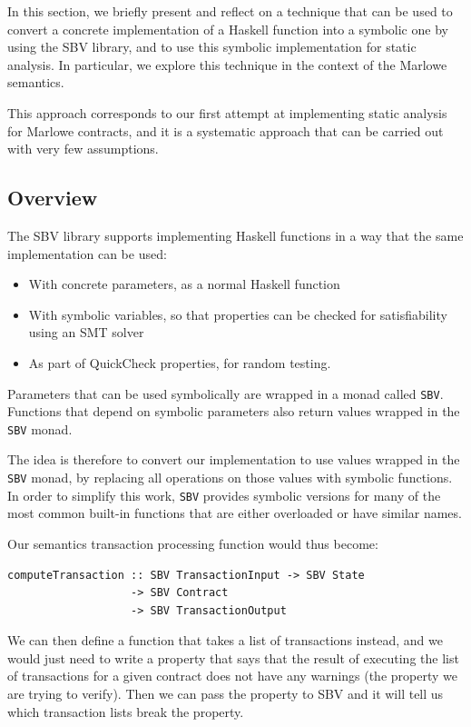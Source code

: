 \documentclass[english,runningheads]{llncs}
\begin{document}
In this section, we briefly present and reflect on a technique that
can be used to convert a concrete implementation of a Haskell function
into a symbolic one by using the SBV library, and to use this symbolic
implementation for static analysis. In particular, we explore this
technique in the context of the Marlowe semantics.

This approach corresponds to our first attempt at implementing static
analysis for Marlowe contracts, and it is a systematic approach that
can be carried out with very few assumptions. 

\subsection{Overview}

The SBV library supports implementing Haskell functions in a way that
the same implementation can be used:
\begin{itemize}
\item With concrete parameters, as a normal Haskell function
\item With symbolic variables, so that properties can be checked for satisfiability
using an SMT solver
\item As part of QuickCheck properties, for random testing.
\end{itemize}
Parameters that can be used symbolically are wrapped in a monad called
\texttt{SBV}. Functions that depend on symbolic parameters also return
values wrapped in the \texttt{SBV} monad.

The idea is therefore to convert our implementation to use values
wrapped in the \texttt{SBV} monad, by replacing all operations on
those values with symbolic functions. In order to simplify this work,
\texttt{SBV} provides symbolic versions for many of the most common
built-in functions that are either overloaded or have similar names.

Our semantics transaction processing function would thus become:

\begin{verbatim}
computeTransaction :: SBV TransactionInput -> SBV State
                   -> SBV Contract
                   -> SBV TransactionOutput
\end{verbatim}

We can then define a function that takes a list of transactions instead,
and we would just need to write a property that says that the result
of executing the list of transactions for a given contract does not
have any warnings (the property we are trying to verify). Then we
can pass the property to SBV and it will tell us which transaction
lists break the property.
\end{document}
